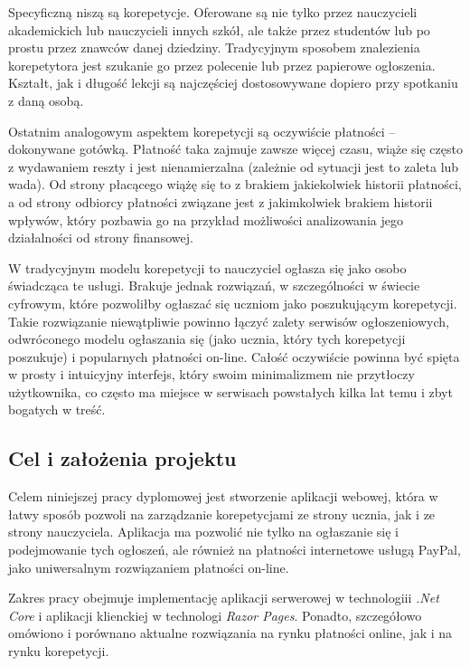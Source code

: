 \documentclass[12pt]{article}
\numberwithin{figure}{section}
\begin{document}
\begin{sloppypar}
Specyficzną niszą są korepetycje. Oferowane są nie tylko przez nauczycieli akademickich lub nauczycieli innych szkół, ale także przez studentów lub po prostu przez znawców danej dziedziny. Tradycyjnym sposobem znalezienia korepetytora jest szukanie go przez polecenie lub przez papierowe ogłoszenia. Kształt, jak i długość lekcji są najczęściej dostosowywane dopiero przy spotkaniu z daną osobą.

Ostatnim analogowym aspektem korepetycji są oczywiście płatności -- dokonywane gotówką. Płatność taka zajmuje zawsze więcej czasu, wiąże się często z wydawaniem reszty i jest nienamierzalna (zależnie od sytuacji jest to zaleta lub wada). Od strony płacącego wiążę się to z brakiem jakiekolwiek historii płatności, a od strony odbiorcy płatności związane jest z jakimkolwiek brakiem historii wpływów, który pozbawia go na przykład możliwości analizowania jego działalności od strony finansowej. 

W tradycyjnym modelu korepetycji to nauczyciel ogłasza się jako osobo świadcząca te usługi. Brakuje jednak rozwiązań, w szczególności w świecie cyfrowym, które pozwoliłby ogłaszać się uczniom jako poszukującym korepetycji. Takie rozwiązanie niewątpliwie powinno łączyć zalety serwisów ogłoszeniowych, odwróconego modelu ogłaszania się (jako ucznia, który tych korepetycji poszukuje) i popularnych płatności on-line. Całość oczywiście powinna być spięta w prosty i intuicyjny interfejs, który swoim minimalizmem nie przytłoczy użytkownika, co często ma miejsce w serwisach powstałych kilka lat temu i zbyt bogatych w treść.
\subsection{Cel i założenia projektu}
Celem niniejszej pracy dyplomowej jest stworzenie aplikacji webowej, która w łatwy sposób pozwoli na zarządzanie korepetycjami ze strony ucznia, jak i ze strony nauczyciela. Aplikacja ma pozwolić nie tylko na ogłaszanie się i podejmowanie tych ogłoszeń, ale również na płatności internetowe usługą PayPal, jako uniwersalnym rozwiązaniem płatności on-line. 

Zakres pracy obejmuje implementację aplikacji serwerowej w technologiii \textit{.Net Core} i aplikacji klienckiej w technologi \textit{Razor Pages}. Ponadto, szczegółowo omówiono i porównano aktualne rozwiązania na rynku płatności online, jak i na rynku korepetycji.


\end{sloppypar}
\end{document}
